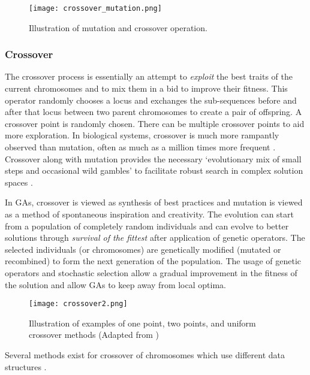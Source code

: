 \documentclass[journal]{IEEEtran}
\begin{document}
\begin{figure}[ht!]
\centering
\texttt{[image: crossover\_mutation.png]}
\caption{Illustration of mutation and crossover operation. }
\label{fig:MutationCrossover}
\end{figure}

\vspace{2mm}
\subsubsection{Crossover}


The crossover process is essentially an attempt to \textit{exploit} the best traits of the current chromosomes and to mix them in a bid to improve their fitness. This operator randomly chooses a locus and exchanges the sub-sequences before and after that locus between two parent chromosomes to create a pair of offspring. A crossover point is randomly chosen. There can be multiple crossover points to aid more exploration. In biological systems, crossover is much more rampantly observed than mutation, often as much as a million times more frequent \cite{holland1995hidden}. Crossover along with mutation provides the necessary `evolutionary mix of small steps and occasional wild gambles' to facilitate robust search in complex solution spaces \cite{harford2011adapt}.

In GAs, crossover is viewed as synthesis of best practices and mutation is viewed as a method of spontaneous inspiration and creativity. The evolution can start from a population of completely random individuals and can evolve to better solutions through \emph{survival of the fittest} after application of genetic operators. The selected individuals (or chromosomes) are genetically modified (mutated or recombined) to form the next generation of the population.  The usage of genetic operators and stochastic selection allow a gradual improvement in the fitness of the solution and allow GAs to keep away from local optima. 





\begin{figure}[ht!]
\centering
\texttt{[image: crossover2.png]}
\caption{Illustration of examples of one point, two points, and uniform crossover methods (Adapted from \cite{sastry2005genetic})}
\label{fig:Crossover2}
\end{figure}

Several methods exist for crossover of chromosomes which use different data structures \cite{goldberg1988genetic}. 
\end{document}
